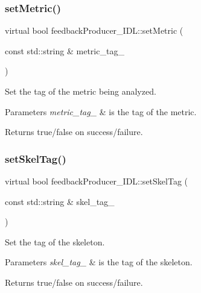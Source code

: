\subsubsection{\texorpdfstring{set\+Metric()}{setMetric()}}
{\footnotesize\ttfamily virtual bool feedback\+Producer\+\_\+\+I\+D\+L\+::set\+Metric (\begin{DoxyParamCaption}\item[{const std\+::string \&}]{metric\+\_\+tag\+\_\+ }\end{DoxyParamCaption})\hspace{0.3cm}{\ttfamily [virtual]}}



Set the tag of the metric being analyzed. 


\begin{DoxyParams}{Parameters}
{\em metric\+\_\+tag\+\_\+} & is the tag of the metric. \\
\hline
\end{DoxyParams}
\begin{DoxyReturn}{Returns}
true/false on success/failure. 
\end{DoxyReturn}
\mbox{\label{classfeedbackProducer__IDL_a415d86e692f8bb4987229f17ca0d90a5}} 
\subsubsection{\texorpdfstring{set\+Skel\+Tag()}{setSkelTag()}}
{\footnotesize\ttfamily virtual bool feedback\+Producer\+\_\+\+I\+D\+L\+::set\+Skel\+Tag (\begin{DoxyParamCaption}\item[{const std\+::string \&}]{skel\+\_\+tag\+\_\+ }\end{DoxyParamCaption})\hspace{0.3cm}{\ttfamily [virtual]}}



Set the tag of the skeleton. 


\begin{DoxyParams}{Parameters}
{\em skel\+\_\+tag\+\_\+} & is the tag of the skeleton. \\
\hline
\end{DoxyParams}
\begin{DoxyReturn}{Returns}
true/false on success/failure. 
\end{DoxyReturn}
\mbox{\label{classfeedbackProducer__IDL_a029ad9dc9918e229624d0dac6f6ca42e}} 
